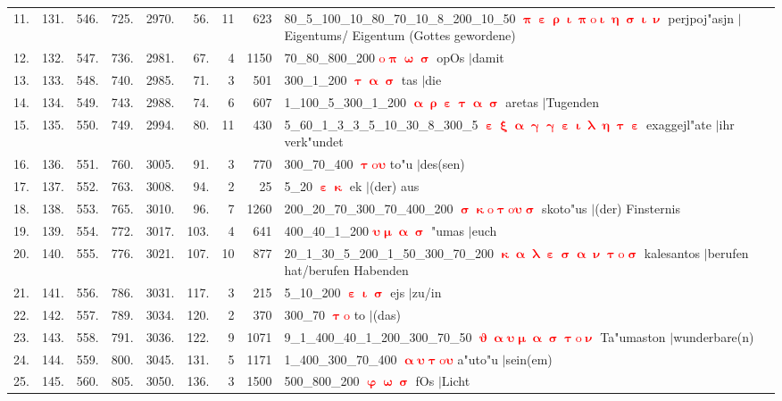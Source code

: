 \documentclass[a4paper,10pt,landscape]{article}
\begin{document}
\begin{tabular}{rrrrrrrrp{120mm}}
11.&131.&546.&725.&2970.&56.&11&623&80\_5\_100\_10\_80\_70\_10\_8\_200\_10\_50 \textcolor{red}{$\boldsymbol{\uppi\upepsilon\uprho\upiota\uppi\mathrm{o}\upiota\upeta\upsigma\upiota\upnu}$} perjpoj"asjn $|$Eigentums/ Eigentum (Gottes gewordene)\\
12.&132.&547.&736.&2981.&67.&4&1150&70\_80\_800\_200 \textcolor{red}{$\boldsymbol{\mathrm{o}\uppi\upomega\upsigma}$} opOs $|$damit\\
13.&133.&548.&740.&2985.&71.&3&501&300\_1\_200 \textcolor{red}{$\boldsymbol{\uptau\upalpha\upsigma}$} tas $|$die\\
14.&134.&549.&743.&2988.&74.&6&607&1\_100\_5\_300\_1\_200 \textcolor{red}{$\boldsymbol{\upalpha\uprho\upepsilon\uptau\upalpha\upsigma}$} aretas $|$Tugenden\\
15.&135.&550.&749.&2994.&80.&11&430&5\_60\_1\_3\_3\_5\_10\_30\_8\_300\_5 \textcolor{red}{$\boldsymbol{\upepsilon\upxi\upalpha\upgamma\upgamma\upepsilon\upiota\uplambda\upeta\uptau\upepsilon}$} exaggejl"ate $|$ihr verk"undet\\
16.&136.&551.&760.&3005.&91.&3&770&300\_70\_400 \textcolor{red}{$\boldsymbol{\uptau\mathrm{o}\upsilon}$} to"u $|$des(sen)\\
17.&137.&552.&763.&3008.&94.&2&25&5\_20 \textcolor{red}{$\boldsymbol{\upepsilon\upkappa}$} ek $|$(der) aus\\
18.&138.&553.&765.&3010.&96.&7&1260&200\_20\_70\_300\_70\_400\_200 \textcolor{red}{$\boldsymbol{\upsigma\upkappa\mathrm{o}\uptau\mathrm{o}\upsilon\upsigma}$} skoto"us $|$(der) Finsternis\\
19.&139.&554.&772.&3017.&103.&4&641&400\_40\_1\_200 \textcolor{red}{$\boldsymbol{\upsilon\upmu\upalpha\upsigma}$} "umas $|$euch\\
20.&140.&555.&776.&3021.&107.&10&877&20\_1\_30\_5\_200\_1\_50\_300\_70\_200 \textcolor{red}{$\boldsymbol{\upkappa\upalpha\uplambda\upepsilon\upsigma\upalpha\upnu\uptau\mathrm{o}\upsigma}$} kalesantos $|$berufen hat/berufen Habenden\\
21.&141.&556.&786.&3031.&117.&3&215&5\_10\_200 \textcolor{red}{$\boldsymbol{\upepsilon\upiota\upsigma}$} ejs $|$zu/in\\
22.&142.&557.&789.&3034.&120.&2&370&300\_70 \textcolor{red}{$\boldsymbol{\uptau\mathrm{o}}$} to $|$(das)\\
23.&143.&558.&791.&3036.&122.&9&1071&9\_1\_400\_40\_1\_200\_300\_70\_50 \textcolor{red}{$\boldsymbol{\upvartheta\upalpha\upsilon\upmu\upalpha\upsigma\uptau\mathrm{o}\upnu}$} Ta"umaston $|$wunderbare(n)\\
24.&144.&559.&800.&3045.&131.&5&1171&1\_400\_300\_70\_400 \textcolor{red}{$\boldsymbol{\upalpha\upsilon\uptau\mathrm{o}\upsilon}$} a"uto"u $|$sein(em)\\
25.&145.&560.&805.&3050.&136.&3&1500&500\_800\_200 \textcolor{red}{$\boldsymbol{\upvarphi\upomega\upsigma}$} fOs $|$Licht\\
\end{tabular}\medskip \\
\end{document}
